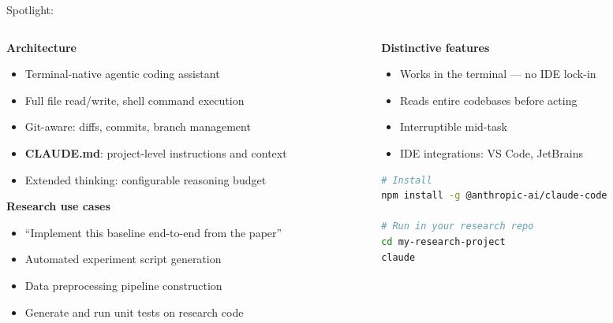 \begin{frame}[fragile, shrink=15]{Spotlight: }
  \begin{columns}[T, onlytextwidth]
    \begin{column}{0.55\textwidth}
      \textbf{Architecture}\\[0.3em]
      \begin{itemize}
        \item Terminal-native agentic coding assistant
        \item Full file read/write, shell command execution
        \item Git-aware: diffs, commits, branch management
        \item \textbf{CLAUDE.md}: project-level instructions and context
        \item Extended thinking: configurable reasoning budget
      \end{itemize}
      \vspace{0.4em}
      \textbf{Research use cases}\\[0.3em]
      \begin{itemize}
        \item ``Implement this baseline end-to-end from the paper''
        \item Automated experiment script generation
        \item Data preprocessing pipeline construction
        \item Generate and run unit tests on research code
      \end{itemize}
    \end{column}
    \hfill
    \begin{column}{0.42\textwidth}
      \small
      \textbf{Distinctive features}\\[0.2em]
      \begin{itemize}
        \item Works in the terminal — no IDE lock-in
        \item Reads entire codebases before acting
        \item Interruptible mid-task
        \item IDE integrations: VS Code, JetBrains
      \end{itemize}
      \vspace{0.2em}
      \begin{lstlisting}[language=bash, numbers=none]
# Install
npm install -g @anthropic-ai/claude-code

# Run in your research repo
cd my-research-project
claude
      \end{lstlisting}
    \end{column}
  \end{columns}
\end{frame}

